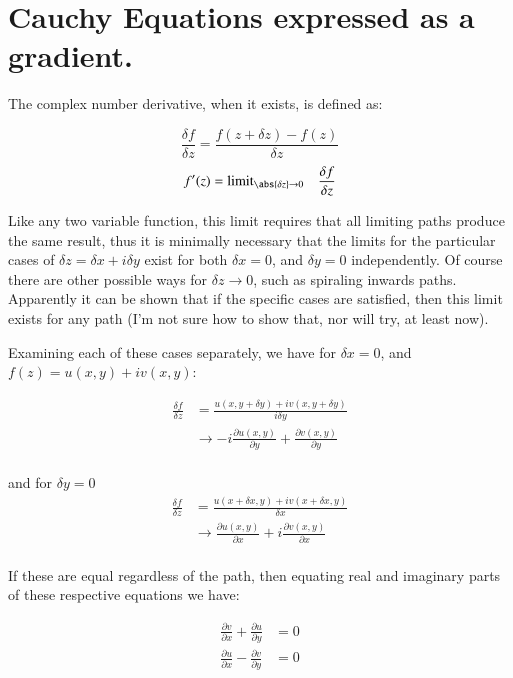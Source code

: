 \chapter{Cauchy Equations expressed as a gradient.}

The complex number derivative, when it exists, is defined as:

\begin{equation*}
\frac{\delta f}{\delta z} = \frac{ f(z + \delta z) - f(z)}{\delta z}
\end{equation*}
\begin{equation*}
f'(z) = {\text{limit}}_{\abs{\delta z} \rightarrow 0} \quad \frac{\delta f}{\delta z}
\end{equation*}

Like any two variable function, this limit requires that all limiting paths produce the same result, thus it is
minimally necessary that the limits for the particular cases of $\delta z = \delta x + i \delta y$ exist for both
$\delta x = 0$, and $\delta y = 0$ independently.  Of course there are other possible ways for $\delta z \rightarrow 0$, such as spiraling inwards paths.  Apparently it can be shown that if the specific cases are satisfied, then this limit exists for any path (I'm not sure how to show that, nor will try, at least now).

Examining each of these cases separately, we have for $\delta x = 0$, and $f(z) = u(x,y) + i v(x,y)$:

\begin{align*}
\frac{\delta f}{\delta z}
&= \frac{u(x,y + \delta y) + i v(x,y + \delta y)}{i\delta y} \\
&\rightarrow -i \frac{\partial u(x,y)}{\partial y} + \frac{\partial v(x,y)}{\partial y} \\
\end{align*}

and for $\delta y = 0$
\begin{align*}
\frac{\delta f}{\delta z}
&= \frac{u(x + \delta x,y) + i v(x + \delta x, y)}{\delta x} \\
&\rightarrow \frac{\partial u(x,y)}{\partial x} + i\frac{\partial v(x,y)}{\partial x} \\
\end{align*}

If these are equal regardless of the path, then equating real and imaginary parts of these respective equations we have:

\begin{align}
\frac{\partial v}{\partial x} + \frac{\partial u}{\partial y} &= 0 \\
\frac{\partial u}{\partial x} - \frac{\partial v}{\partial y} &= 0
\end{align}

